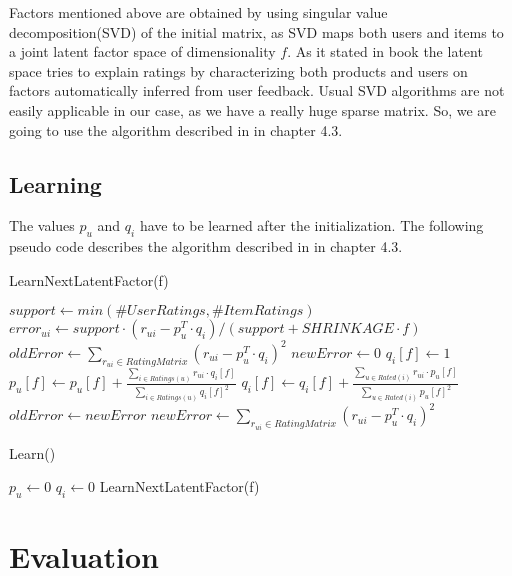 \documentclass[pdftex,a4paper,11pt]{article}
\begin{document}
Factors mentioned above are obtained by using singular value decomposition(SVD) of the initial matrix, as SVD maps both users and items to a joint latent factor space of dimensionality $ f $. As it stated in book \cite{1} the latent space tries to explain ratings by characterizing both products and users on factors automatically inferred from user feedback. Usual SVD algorithms are not easily applicable in our case, as we have a really huge sparse matrix. So, we are going to use the algorithm described in \cite{2} in chapter 4.3. 

\subsection{Learning}

The values $p_u$ and $q_i$ have to be learned after the initialization. The following pseudo code describes the algorithm described in \cite{2} in chapter 4.3.

\begin{algorithm}
\caption{LearnNextLatentFactor(f)}
\begin{algorithmic}
\STATE $support \leftarrow min(\#UserRatings, \#ItemRatings)$
\STATE $error_{ui} \leftarrow support \cdot (r_{ui} - p_u^T \cdot q_i) / (support + SHRINKAGE \cdot f)$
\ENDFOR
\STATE $oldError \leftarrow \sum_{r_{ui} \in RatingMatrix} (r_{ui} - p_u^T \cdot q_i)^2 $
\STATE $newError \leftarrow 0$
\STATE $q_i[f] \leftarrow 1$
\ENDFOR
{}
\STATE $p_u[f] \leftarrow p_u[f]+\frac{\sum_{i \in Ratings(u)} r_{ui} \cdot q_i[f]}{\sum_{i \in Ratings(u)} q_i[f]^2}$
\STATE $q_i[f] \leftarrow q_i[f]+\frac{\sum_{u \in Rated(i)} r_{ui} \cdot p_u[f]}{\sum_{u \in Rated(i)} p_u[f]^2}$
\STATE $oldError \leftarrow newError$
\STATE $newError \leftarrow \sum_{r_{ui} \in RatingMatrix} (r_{ui} - p_u^T \cdot q_i)^2$
\ENDWHILE
\end{algorithmic}
\end{algorithm}

\begin{algorithm}
\caption{Learn()}
\begin{algorithmic}
\STATE $p_u \leftarrow 0$
\STATE $q_i \leftarrow 0$
\STATE LearnNextLatentFactor(f)
\ENDFOR
\end{algorithmic}
\end{algorithm}



\section{Evaluation}
\end{document}
